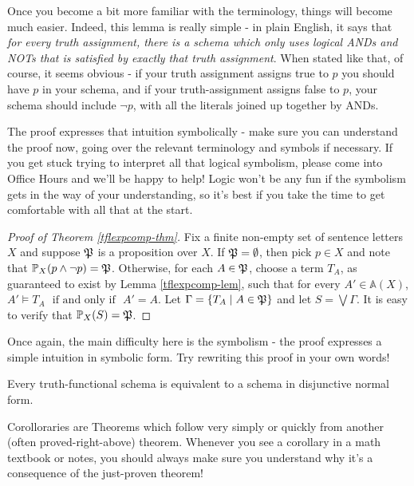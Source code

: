 \begin{aside}
    Once you become a bit more familiar with the terminology, things will become much easier. Indeed, this lemma is really simple - in plain English, it says that \emph{for every truth assignment, there is a schema which only uses logical ANDs and NOTs that is satisfied by exactly that truth assignment}. When stated like that, of course, it seems obvious - if your truth assignment assigns true to $p$ you should have $p$ in your schema, and if your truth-assignment assigns false to $p$, your schema should include $\lnot p$, with all the literals joined up together by ANDs. 

    The proof expresses that intuition symbolically - make sure you can understand the proof now, going over the relevant terminology and symbols if necessary. If you get stuck trying to interpret all that logical symbolism, please come into Office Hours and we'll be happy to help! Logic won't be any fun if the symbolism gets in the way of your %
    understanding, so it's best if you take the time to get comfortable with all that at the start. 
\end{aside}

\begin{proof}[Proof of Theorem \ref{tflexpcomp-thm}]
Fix a finite non-empty set of sentence letters $X$ and suppose $\mfp$ is a proposition over $X$. If $\mfp=\emptyset$, then pick $p\in X$ and note that $\prop{p\wedge\neg p}{X} = \mfp$. Otherwise, for each $A\in\mfp$, choose a term $T_A$, as guaranteed to exist by Lemma \ref{tflexpcomp-lem}, such that for every $A'\in\mathbb{A}(X)$, 
$A'\models T_A\ \ \ \mbox{if and only if}\ \ \ A'=A$. Let $\Gamma = \{T_A\mid A\in\mfp\}$ and let $S=\bigvee\Gamma$. It is easy to verify that $\prop{S}{X}=\mfp$.
\end{proof}

\begin{aside}
    Once again, the main difficulty here is the symbolism - the proof expresses a simple intuition in symbolic form. Try rewriting this proof in your own words!
\end{aside}

\begin{corollary}\label{dnf-cor}
Every truth-functional schema is equivalent to a schema in disjunctive normal form.
\end{corollary}

\begin{aside}
    Corolloraries are Theorems which follow very simply or quickly from another (often proved-right-above) theorem. Whenever you see a corollary in a math textbook or notes, you should always make sure you understand why it's a consequence of the just-proven theorem!
\end{aside}
